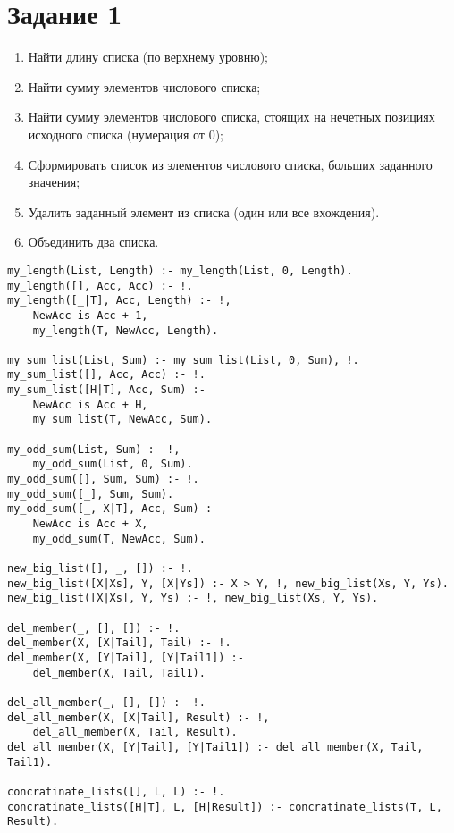 \documentclass[a4paper,14pt, unknownkeysallowed]{extreport}
\begin{document}


\section*{Задание 1}

\begin{enumerate}
	\item Найти длину списка (по верхнему уровню);
	\item Найти сумму элементов числового списка;
	\item Найти сумму элементов числового списка, стоящих на нечетных позициях исходного
	списка (нумерация от 0);
	\item Сформировать список из элементов числового списка, больших заданного значения;
	\item Удалить заданный элемент из списка (один или все вхождения).
	\item Объединить два списка.
\end{enumerate}


\begin{lstlisting}
my_length(List, Length) :- my_length(List, 0, Length).
my_length([], Acc, Acc) :- !.
my_length([_|T], Acc, Length) :- !,
	NewAcc is Acc + 1,
	my_length(T, NewAcc, Length).

my_sum_list(List, Sum) :- my_sum_list(List, 0, Sum), !.
my_sum_list([], Acc, Acc) :- !.
my_sum_list([H|T], Acc, Sum) :- 
	NewAcc is Acc + H,
	my_sum_list(T, NewAcc, Sum).

my_odd_sum(List, Sum) :- !,
	my_odd_sum(List, 0, Sum).
my_odd_sum([], Sum, Sum) :- !.
my_odd_sum([_], Sum, Sum).
my_odd_sum([_, X|T], Acc, Sum) :-
	NewAcc is Acc + X,
	my_odd_sum(T, NewAcc, Sum).

new_big_list([], _, []) :- !.
new_big_list([X|Xs], Y, [X|Ys]) :- X > Y, !, new_big_list(Xs, Y, Ys).
new_big_list([X|Xs], Y, Ys) :- !, new_big_list(Xs, Y, Ys).

del_member(_, [], []) :- !.
del_member(X, [X|Tail], Tail) :- !.
del_member(X, [Y|Tail], [Y|Tail1]) :-
	del_member(X, Tail, Tail1).

del_all_member(_, [], []) :- !.
del_all_member(X, [X|Tail], Result) :- !,
	del_all_member(X, Tail, Result).
del_all_member(X, [Y|Tail], [Y|Tail1]) :- del_all_member(X, Tail, Tail1).

concratinate_lists([], L, L) :- !.
concratinate_lists([H|T], L, [H|Result]) :- concratinate_lists(T, L, Result).
\end{lstlisting}
\end{document}
